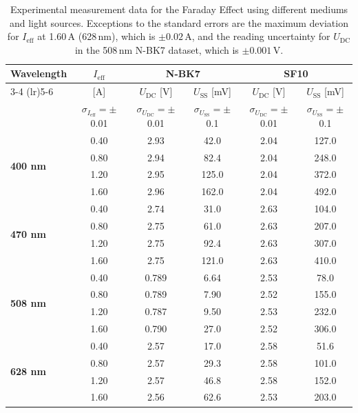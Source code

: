 \documentclass[a4paper]{article}
\renewcommand{\arraystretch}{0.9}
\begin{document}
\begin{table}[H]
  \centering
  \renewcommand{\arraystretch}{1.2}
  \setlength{\tabcolsep}{5pt}
  \begin{tabular}{l c c c c c}
    \toprule
    \multirow{2}{*}{\textbf{Wavelength}} & \textbf{$I_{\mathrm{eff}}$} & \multicolumn{2}{c}{\textbf{N-BK7}} & \multicolumn{2}{c}{\textbf{SF10}} \\
    \cmidrule(lr){3-4} \cmidrule(lr){5-6}
    & [A] & $U_{\mathrm{DC}}$ [V] & $U_{\mathrm{SS}}$ [mV] & $U_{\mathrm{DC}}$ [V] & $U_{\mathrm{SS}}$ [mV] \\
    & $\sigma_{I_{\mathrm{eff}}}=\pm$ 0.01 & $\sigma_{U_{\mathrm{DC}}}=\pm$ 0.01 & $\sigma_{U_{\mathrm{SS}}}=\pm$ 0.1 & $\sigma_{U_{\mathrm{DC}}}=\pm$ 0.01 & $\sigma_{U_{\mathrm{SS}}}=\pm$ 0.1\\
    \midrule
    \multirow{4}{*}{\textbf{400 nm}}
    & 0.40 & 2.93  & 42.0  & 2.04 & 127.0 \\
    & 0.80 & 2.94  & 82.4  & 2.04 & 248.0 \\
    & 1.20 & 2.95  & 125.0 & 2.04 & 372.0 \\
    & 1.60 & 2.96  & 162.0 & 2.04 & 492.0 \\
    \midrule
    \multirow{4}{*}{\textbf{470 nm}}
    & 0.40 & 2.74  & 31.0  & 2.63 & 104.0 \\
    & 0.80 & 2.75  & 61.0  & 2.63 & 207.0 \\
    & 1.20 & 2.75  & 92.4  & 2.63 & 307.0 \\
    & 1.60 & 2.75  & 121.0 & 2.63 & 410.0 \\
    \midrule
    \multirow{4}{*}{\textbf{508 nm}}
    & 0.40 & 0.789 & 6.64  & 2.53 & 78.0  \\
    & 0.80 & 0.789 & 7.90  & 2.52 & 155.0 \\
    & 1.20 & 0.787 & 9.50  & 2.53 & 232.0 \\
    & 1.60 & 0.790 & 27.0  & 2.52 & 306.0 \\
    \midrule
    \multirow{4}{*}{\textbf{628 nm}}
    & 0.40 & 2.57  & 17.0  & 2.58 & 51.6  \\
    & 0.80 & 2.57  & 29.3  & 2.58 & 101.0 \\
    & 1.20 & 2.57  & 46.8  & 2.58 & 152.0 \\
    & 1.60 & 2.56  & 62.6  & 2.53 & 203.0 \\
    \bottomrule
  \end{tabular}
  \caption{Experimental measurement data for the Faraday Effect using different mediums and light sources. Exceptions to the standard errors are the maximum deviation for $I_{\mathrm{eff}}$ at 1.60\,A (628\,nm), which is $\pm 0.02$\,A, and the reading uncertainty for $U_{\mathrm{DC}}$ in the 508\,nm N-BK7 dataset, which is $\pm 0.001$\,V.}\label{tab:rotation_angle}
\end{table}
\end{document}
